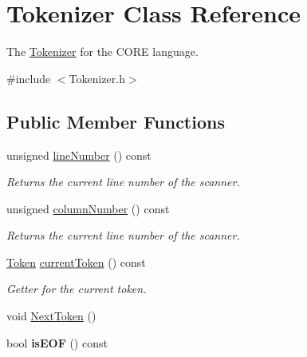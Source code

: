 \hypertarget{class_tokenizer}{}\section{Tokenizer Class Reference}
\label{class_tokenizer}


The \mbox{\hyperlink{class_tokenizer}{Tokenizer}} for the C\+O\+RE language.  




{\ttfamily \#include $<$Tokenizer.\+h$>$}

\subsection*{Public Member Functions}
\begin{DoxyCompactItemize}
\item 
\mbox{\label{class_tokenizer_af020d45782d1521b3e5ee4a9cd7acebd}} 
unsigned \mbox{\hyperlink{class_tokenizer_af020d45782d1521b3e5ee4a9cd7acebd}{line\+Number}} () const
\begin{DoxyCompactList}\small\item\em Returns the current line number of the scanner. \end{DoxyCompactList}\item 
\mbox{\label{class_tokenizer_a02593818a4c3b60db4d2425e2b0aa697}} 
unsigned \mbox{\hyperlink{class_tokenizer_a02593818a4c3b60db4d2425e2b0aa697}{column\+Number}} () const
\begin{DoxyCompactList}\small\item\em Returns the current line number of the scanner. \end{DoxyCompactList}\item 
\mbox{\label{class_tokenizer_ab1963dc9bf28086609425b8ff44bf6e3}} 
\mbox{\hyperlink{class_token}{Token}} \mbox{\hyperlink{class_tokenizer_ab1963dc9bf28086609425b8ff44bf6e3}{current\+Token}} () const
\begin{DoxyCompactList}\small\item\em Getter for the current token. \end{DoxyCompactList}\item 
void \mbox{\hyperlink{class_tokenizer_aa11b05ea9caa12ea7aa0dfc7f24fa21c}{Next\+Token}} ()
\item 
\mbox{\label{class_tokenizer_aa46f97aad1d509fe3d6239d9685d1aa8}} 
bool {\bfseries is\+E\+OF} () const
\end{DoxyCompactItemize}
